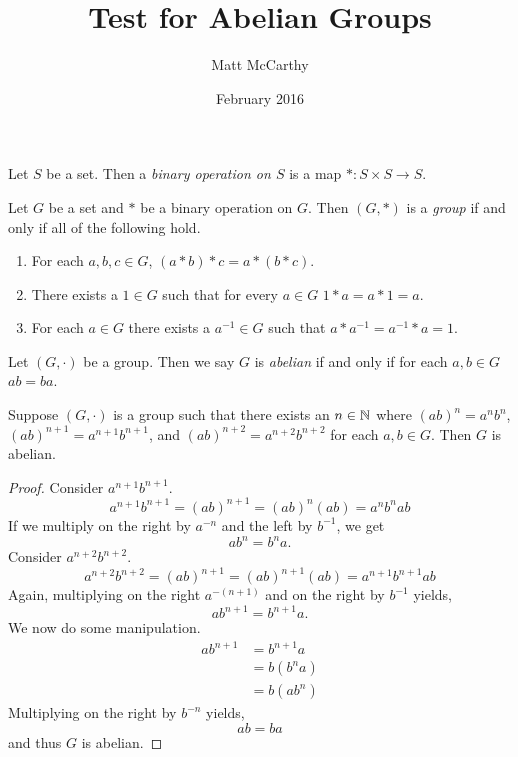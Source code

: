 \documentclass[notitlepage]{simple}
\author{Matt McCarthy}
\date{February 2016}
\title{Test for Abelian Groups}
\begin{document}
	\maketitle
	\begin{definition}
		Let $S$ be a set.
		Then a \textit{binary operation on $S$} is a map $*:S\times S\rightarrow S$.
	\end{definition}
	\begin{definition}
		Let $G$ be a set and $*$ be a binary operation on $G$.
		Then $(G,*)$ is a \textit{group} if and only if all of the following hold.
		\begin{enumerate}
			\item For each $a,b,c\in G$, $(a*b)*c=a*(b*c)$.
			\item There exists a $1\in G$ such that for every $a\in G$ $1* a=a* 1=a$.
			\item For each $a\in G$ there exists a $a^{-1}\in G$ such that $a*a^{-1}=a^{-1}*a=1$.
		\end{enumerate}
	\end{definition}
	\begin{definition}
		Let $(G,\cdot)$ be a group.
		Then we say $G$ is \textit{abelian} if and only if for each $a,b\in G$ $ab=ba$.
	\end{definition}
	\begin{thm}
		Suppose $(G,\cdot)$ is a group such that there exists an $n\in\mathbb{N}$ where $(ab)^n=a^nb^n$, $(ab)^{n+1}=a^{n+1}b^{n+1}$, and $(ab)^{n+2}=a^{n+2}b^{n+2}$ for each $a,b\in G$.
		Then $G$ is abelian.
	\end{thm}
	\begin{proof}
		Consider $a^{n+1}b^{n+1}$.
		\[
			a^{n+1}b^{n+1} = (ab)^{n+1}=(ab)^n(ab)=a^nb^nab
		\]
		If we multiply on the right by $a^{-n}$ and the left by $b^{-1}$, we get
		\[
			ab^n=b^na.
		\]
		Consider $a^{n+2}b^{n+2}$.
		\[
			a^{n+2}b^{n+2} = (ab)^{n+1}=(ab)^{n+1}(ab)=a^{n+1}b^{n+1}ab
		\]
		Again, multiplying on the right $a^{-(n+1)}$ and on the right by $b^{-1}$ yields,
		\[
			ab^{n+1}=b^{n+1}a.
		\]
		We now do some manipulation.
		\begin{align*}
			ab^{n+1}&=b^{n+1}a\\
			&=b(b^na)\\
			&=b(ab^n)
		\end{align*}
		Multiplying on the right by $b^{-n}$ yields,
		\[
			ab=ba
		\]
		and thus $G$ is abelian.
	\end{proof}
\end{document}
